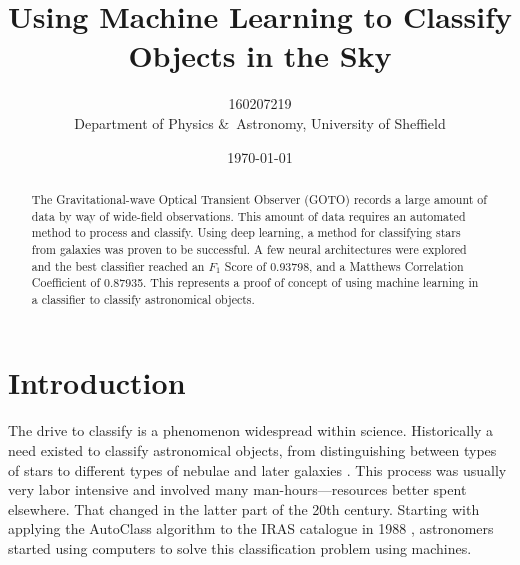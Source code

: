 \documentclass[a4paper,fleqn,usenatbib]{mnras}
\title[Machine Learning Astronomical Classification]{Using Machine Learning to Classify Objects in the Sky}
\author[160207219]{160207219
\\
Department of Physics \&\ Astronomy, University of Sheffield}
\date{\today}
\begin{document}
\label{firstpage}
\pagerange{\pageref{firstpage}--\pageref{lastpage}}
\maketitle

\begin{abstract}
The Gravitational-wave Optical Transient Observer (GOTO) records a large amount of data by way of wide-field observations. This amount of data requires an automated method to process and classify. Using deep learning, a method for classifying stars from galaxies was proven to be successful. A few neural architectures were explored and the best classifier reached an $F_1$ Score of 0.93798, and a Matthews Correlation Coefficient of 0.87935. This represents a proof of concept of using machine learning in a classifier to classify astronomical objects. 
\end{abstract}







\section{Introduction}
\label{sec:introduction}

The drive to classify is a phenomenon widespread within science. Historically a need existed to classify astronomical objects, from distinguishing between types of stars \citep{HarvardClassification} to different types of nebulae \citep{Nebulae} and later galaxies \citep{Hubble}. This process was usually very labor intensive and involved many man-hours---resources better spent elsewhere. That changed in the latter part of the 20th century. Starting with applying the AutoClass algorithm to the IRAS catalogue in 1988 \citep{adorf_1988_supervised}, astronomers started using computers to solve this classification problem using machines.
\end{document}
